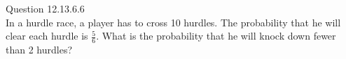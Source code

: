 \documentclass[11pt]{book}
\begin{document}
Question 12.13.6.6
\\In a hurdle race, a player has to cross 10 hurdles. The probability that he will clear each hurdle is $\frac{5}{6}$. What is the probability that he will knock down fewer than 2 hurdles?
\end{document}
